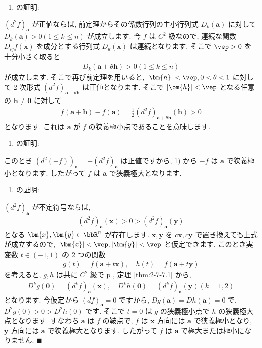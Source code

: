 \documentclass[openany, a4paper, oneside]{jsbook}
\begin{document}
\begin{enumerate}
\item の証明:
\end{enumerate}
$(d^2f)_{\bm{a}}$ が正値ならば, 前定理からその係数行列の主小行列式 $D_k (\bm{a})$ に対して
$D_k (\bm{a}) > 0 (1 \leq k \leq n)$ が成立します.
今 $f$ は $C^2$ 級なので, 連続な関数 $D_{ij} f ( \bm{x} )$ を成分とする行列式 $D_k (\bm{x})$ は連続となります.
そこで $\vep>0$ を十分小さく取ると
\begin{align}
D_k ( \bm{a} + \theta \bm{h} )
>
0 ( 1 \leq k \leq n )
\end{align}
が成立します.
そこで再び前定理を用いると,  $|\bm{h}|<\vep,0<\theta<1$ に対して
2 次形式 $(d^2f)_{\bm{a}+\theta\bm{h}}$ は正値となります.
そこで $|\bm{h}|<\vep$ となる任意の $\bm{h}\not=\bm{0}$ に対して
\begin{align}
f (\bm{a} + \bm{h} ) - f ( \bm{a} )
=
\frac{1} {2} ( d^2 f)_{ \bm{a} + \theta \bm{h} } ( \bm{h} )
>
0
\end{align}
となります. これは $\bm{a}$ が $f$ の狭義極小点であることを意味します.

\begin{enumerate}
\item の証明:
\end{enumerate}
このとき $(d^2 ( -f ) )_{ \bm{a} } = - ( d^2 f)_{ \bm{a} }$
は正値ですから, 1) から $-f$ は $\bm{a}$ で狭義極小となります.
したがって $f$ は $\bm{a}$ で狭義極大となります.

\begin{enumerate}
\item の証明:
\end{enumerate}
$( d^2 f)_{ \bm{a} }$ が不定符号ならば,
\begin{align}
( d^2 f)_{ \bm{a} } ( \bm{x} )
>
0
>
( d^2 f)_{ \bm{a} } ( \bm{y} )
\end{align}
となる $\bm{x},\bm{y}\in\bbR^n$ が存在します.
$\bm{x},\bm{y}$ を $c\bm{x},c\bm{y}$ で置き換えても上式が成立するので,
$|\bm{x}|<\vep,|\bm{y}|<\vep$ と仮定できます.
このとき実変数 $t \in ( -1 , 1 )$ の 2 つの関数
\begin{align}
g (t)
=
f ( \bm{a} + t \bm{x} )
, \quad
h (t)
=
f ( \bm{a} + t \bm{y} )
\end{align}
を考えると,  $g,h$ は共に $C^2$ 級で p \pageref{thm:2-7-7.1}, 定理 \ref{thm:2-7-7.1} から,
\begin{align}
D^k g ( \bm{0} )
=
( d^k f )_{\bm{a}} ( \bm{x} )
, \quad
D^k h ( \bm{0} )
=
( d^k f )_{\bm{a}} ( \bm{y} )
(k = 1,2 )
\end{align}
となります.
今仮定から $(df)_{\bm{a}}=0$ ですから,  $Dg (\bm{a})=D h (\bm{a})=0$ で,
$D^2g (0)>0>D^2h (0)$ です.
そこで $t=0$ は $g$ の狭義極小点で $h$ の狭義極大点となります.
すなわち $\bm{a}$ は $f$ の鞍点で,  $f$ は $\bm{x}$ 方向には $\bm{a}$ で狭義極小となり,
$\bm{y}$ 方向には $\bm{a}$ で狭義極大となります.
したがって $f$ は $\bm{a}$ で極大または極小になりません.  $\blacksquare$
\end{document}
